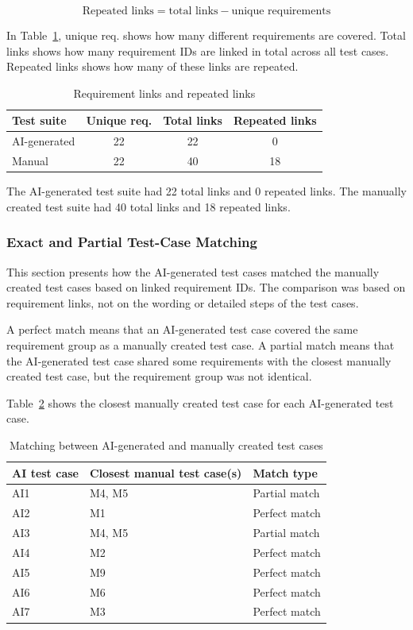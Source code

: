 \documentclass[a4paper,12pt]{article}
\begin{document}
\[
\text{Repeated links} = \text{total links} - \text{unique requirements}
\]

In Table~\ref{tab:requirement_links}, unique req. shows how many different requirements are covered. Total links shows how many requirement IDs are linked in total across all test cases. Repeated links shows how many of these links are repeated.

\begin{table}[H]
\centering
\caption{Requirement links and repeated links}
\label{tab:requirement_links}
\begin{tabular}{lccc}
\toprule
\textbf{Test suite} & \textbf{Unique req.} & \textbf{Total links} & \textbf{Repeated links} \\
\midrule
AI-generated & 22 & 22 & 0 \\
Manual & 22 & 40 & 18 \\
\bottomrule
\end{tabular}
\end{table}

The AI-generated test suite had 22 total links and 0 repeated links. The manually created test suite had 40 total links and 18 repeated links.

\subsubsection{Exact and Partial Test-Case Matching}
This section presents how the AI-generated test cases matched the manually created test cases based on linked requirement IDs. The comparison was based on requirement links, not on the wording or detailed steps of the test cases.

A perfect match means that an AI-generated test case covered the same requirement group as a manually created test case. A partial match means that the AI-generated test case shared some requirements with the closest manually created test case, but the requirement group was not identical.

Table~\ref{tab:testcase_matching} shows the closest manually created test case for each AI-generated test case.

\begin{table}[H]
\centering
\caption{Matching between AI-generated and manually created test cases}
\label{tab:testcase_matching}
\begin{tabular}{lll}
\toprule
\textbf{AI test case} & \textbf{Closest manual test case(s)} & \textbf{Match type} \\
\midrule
AI1 & M4, M5 & Partial match \\
AI2 & M1 & Perfect match \\
AI3 & M4, M5 & Partial match \\
AI4 & M2 & Perfect match \\
AI5 & M9 & Perfect match \\
AI6 & M6 & Perfect match \\
AI7 & M3 & Perfect match \\
\bottomrule
\end{tabular}
\end{table}
\end{document}
